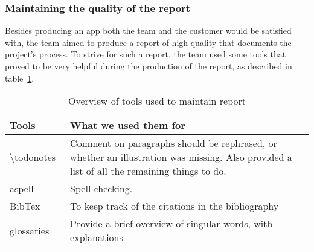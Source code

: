 \subsubsection{Maintaining the quality of the report}
Besides producing an app both the team and the customer would be satisfied with, the team aimed to produce a report of high quality that documents the project's process. To strive for such a report, the team used some tools that proved to be very helpful during the production of the report, as described in table~\ref{tab:reportTools}.

\begin{table}[H]
\begin{tabular}{|l|p{13cm}|}
\hline
\textbf{Tools} & \textbf{What we used them for}\\\hline
\textbackslash todonotes~\cite{todo}&Comment on paragraphs should be rephrased, or whether an illustration was missing. Also provided a list of all the remaining things to do.\\\hline
aspell~\cite{aspell} & Spell checking.\\\hline
BibTex~\cite{bibtex}&To keep track of the citations in the bibliography\\\hline
glossaries~\cite{glossaries}& Provide a brief overview of singular words, with explanations\\\hline
\end{tabular}
\caption{Overview of tools used to maintain report}
\label{tab:reportTools}
\end{table}

\begin{comment}
\subsubsection{\textbackslash todonotes}
Feedback is key when creating a product. The \textbackslash todonotes~\cite{todo} package allowed the team to comment on paragraphs and formulations we wanted to rephrase, whether an illustration was missing, and also gave us a list of all the things we had to do, making it easy to get an overview of the remaining tasks regarding the report.\\

\subsubsection{Spell checking: aspell}
Although manual proofreading cannot be avoided, it is advantageous to have a tool to perform automatic spell checking. Aspell~\cite{aspell} is such a tool.\\

\subsubsection{References and glossary}
To keep track of the citations in the bibliography in the report, we used a LaTeX-package called BibTex~\cite{bibtex}, and for our glossaries, a package called glossaries~\cite{glossaries}.

\end{comment}
